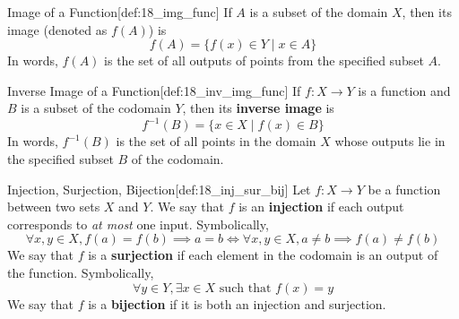 \begin{defBox}{Image of a Function}[def:18_img_func]
    If \( A \) is a subset of the domain \( X \), then its image (denoted as 
    \( f ( A ) \)) is 
    \begin{equation*}
        f ( A )
        =
        \{ f ( x ) \in Y \mid x \in A \}
    \end{equation*}
    In words, \( f ( A ) \) is the set of all outputs of points from the 
    specified subset \( A \).
\end{defBox}

\begin{defBox}{Inverse Image of a Function}[def:18_inv_img_func]
    If \( f: X \rightarrow Y \) is a function and \( B \) is a subset of the 
    codomain \( Y \), then its \textbf{inverse image} is 
    \begin{equation*}
        f^{ -1 } ( B )
        =
        \{ x \in X \mid f ( x ) \in B \}
    \end{equation*}
    In words, \( f^{ -1 } ( B ) \) is the set of all points in the domain 
    \( X \) whose outputs lie in the specified subset \( B \) of the codomain.
\end{defBox}

\begin{defBox}{Injection, Surjection, Bijection}[def:18_inj_sur_bij]
    Let \( f: X \rightarrow Y \) be a function between two sets \( X \) and 
    \( Y \).
    We say that \( f \) is an \textbf{injection} if each output corresponds
    to \textit{at most} one input. Symbolically, 
    \begin{equation*}
        \forall x, y \in X,
        f ( a ) = f ( b ) \implies a = b
        \iff 
        \forall x, y \in X,
        a \neq b \implies f ( a ) \neq f ( b )
    \end{equation*}
    We say that \( f \) is a \textbf{surjection} if each element in the codomain
    is an output of the function. Symbolically, 
    \begin{equation*}
        \forall y \in Y, 
        \exists x \in X
        \text{ such that }
        f ( x ) = y
    \end{equation*}
    We say that \( f \) is a \textbf{bijection} if it is both an injection and 
    surjection.
\end{defBox}

